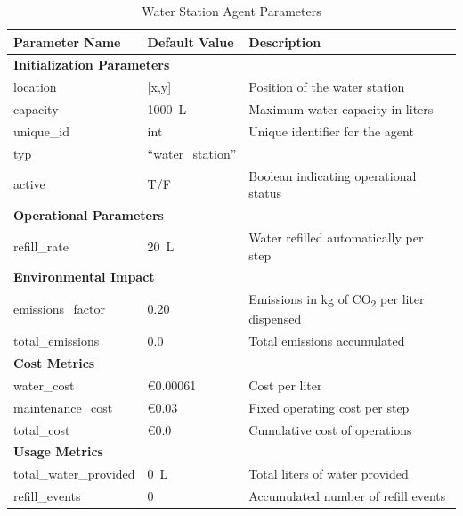 \documentclass[11pt, a4paper]{article}
\begin{document}
\begin{table}[htbp]
\centering
\caption{Water Station Agent Parameters}
\label{tab:water_station_parameters}
\small
\begin{tabular}{@{}p{4cm}p{2cm}p{6cm}@{}}
\toprule
\textbf{Parameter Name} & \textbf{Default Value} & \textbf{Description} \\
\midrule
\multicolumn{3}{l}{\textbf{Initialization Parameters}} \\
\midrule
location & [x,y] & Position of the water station \\
capacity & \SI{1000}{\liter} & Maximum water capacity in liters \\
unique\_id & int & Unique identifier for the agent \\
typ & ``water\_station'' &  \\
active & T/F & Boolean indicating operational status \\
\midrule
\multicolumn{3}{l}{\textbf{Operational Parameters}} \\
\midrule
refill\_rate & \SI{20}{\liter} & Water refilled automatically per step \\
\midrule
\multicolumn{3}{l}{\textbf{Environmental Impact}} \\
\midrule
emissions\_factor & 0.20 & Emissions in kg of CO\textsubscript{2} per liter dispensed \\
total\_emissions & 0.0 & Total emissions accumulated \\
\midrule
\multicolumn{3}{l}{\textbf{Cost Metrics}} \\
\midrule
water\_cost & €0.00061 & Cost per liter \citep{waterPricing} \\
maintenance\_cost & €0.03 & Fixed operating cost per step \\
total\_cost & €0.0 & Cumulative cost of operations \\
\midrule
\multicolumn{3}{l}{\textbf{Usage Metrics}} \\
\midrule
total\_water\_provided & \SI{0}{\liter} & Total liters of water provided \\
refill\_events & 0 & Accumulated number of refill events \\
\bottomrule
\end{tabular}
\end{table}
\end{document}
